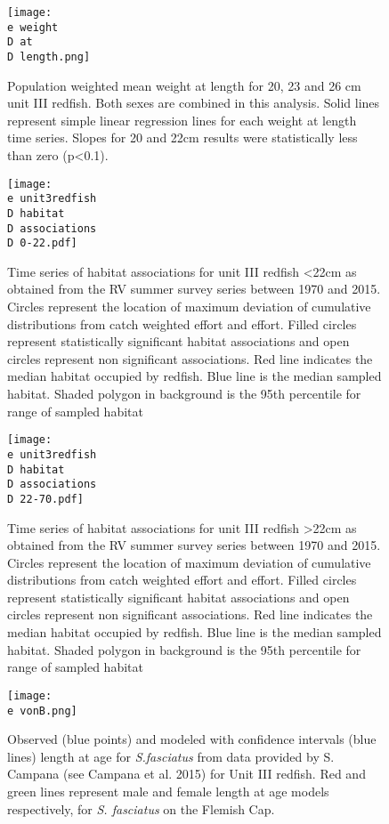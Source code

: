 \documentclass[11pt]{article}
\newcommand{\D}{.}
\newcommand{\e}{/home/ecomod_data/redfish/figures/}
\begin{document}
\begin{figure}
\centering
    
    \texttt{[image: \\e weight\\D at\\D length.png]}
    \caption{Population weighted mean weight at length for 20, 23 and 26 cm unit III redfish. Both sexes are combined in this analysis. Solid lines represent simple linear regression lines for each weight at length time series. Slopes for 20 and 22cm results were statistically less than zero (p\textless 0.1). }

\end{figure}
\clearpage

\begin{figure}
\centering
    
    \texttt{[image: \\e unit3redfish\\D habitat\\D associations\\D 0-22.pdf]}
    \caption{Time series of habitat associations for unit III redfish \textless 22cm as obtained from the RV summer survey
series between 1970 and 2015. Circles represent the location of maximum deviation of
cumulative distributions from catch weighted effort and effort. Filled circles represent statistically
significant habitat associations and open circles represent non significant associations. Red line indicates
the median habitat occupied by redfish. Blue line is the median sampled habitat. Shaded polygon in
background is the 95th percentile for range of sampled habitat}
\end{figure}
\clearpage

\begin{figure}
\centering
    
    \texttt{[image: \\e unit3redfish\\D habitat\\D associations\\D 22-70.pdf]}
    \caption{Time series of habitat associations for unit III redfish \textgreater 22cm as obtained from the RV summer survey
series between 1970 and 2015. Circles represent the location of maximum deviation of
cumulative distributions from catch weighted effort and effort. Filled circles represent statistically
significant habitat associations and open circles represent non significant associations. Red line indicates
the median habitat occupied by redfish. Blue line is the median sampled habitat. Shaded polygon in
background is the 95th percentile for range of sampled habitat}
\end{figure}
\clearpage



\begin{figure}
\centering
    
    \texttt{[image: \\e vonB.png]}
    \caption{Observed (blue points) and modeled with confidence intervals (blue lines) length at age for \emph{S.fasciatus} from data provided by S. Campana (see Campana et al. 2015) for Unit III redfish. Red and green lines represent male and female length at age models respectively, for \emph{S. fasciatus} on the Flemish Cap.}

\end{figure}
\clearpage
\end{document}
